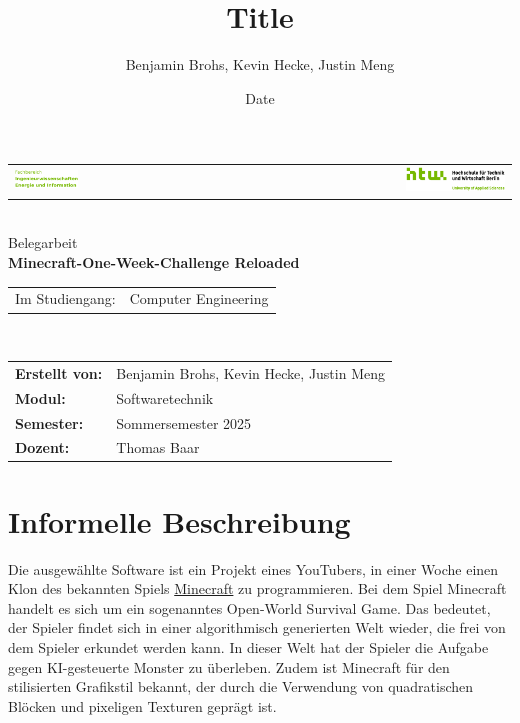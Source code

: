\documentclass{article}
\title{Title}
\author{Benjamin Brohs, Kevin Hecke, Justin Meng}
\date{Date}
\begin{document}

\begin{titlepage}
  \centering
	\begin{tabular}{lcr}
		\includegraphics[width=0.35\textwidth]{fachbereich.png} & \hspace{0.195\textwidth} & \includegraphics[width=0.35\textwidth]{Q04_HTW_Berlin_Logo_quer_pos_FARBIG_RGB.jpg}\\
	\end{tabular}	
	\\[3cm]
	\Large
	Belegarbeit\\
	\vspace{2cm}
	\textbf{Minecraft-One-Week-Challenge Reloaded}\\
	\vspace{2cm}
	\begin{tabular}{ll} 
		Im Studiengang: & Computer Engineering \\		
	\end{tabular}	
	\\[3cm]
	\normalsize
	\begin{tabular}{ll}
	      \textbf{Erstellt von:} & Benjamin Brohs, Kevin Hecke, Justin Meng \\
        \textbf{Modul:} & Softwaretechnik \\
        \textbf{Semester:} & Sommersemester 2025 \\
	\textbf{Dozent:} & Thomas Baar
	\end{tabular}	
\end{titlepage}

\tableofcontents

\newpage


\section{Informelle Beschreibung} \label{subsec:inf}

Die ausgewählte Software ist ein Projekt eines YouTubers, in einer Woche einen Klon des bekannten Spiels \href{https://www.minecraft.net}{Minecraft} zu programmieren. Bei dem Spiel Minecraft handelt es sich um ein sogenanntes Open-World Survival Game. Das bedeutet, der Spieler findet sich in einer algorithmisch generierten Welt wieder, die frei von dem Spieler erkundet werden kann. In dieser Welt hat der Spieler die Aufgabe gegen KI-gesteuerte Monster zu überleben. Zudem ist Minecraft für den stilisierten Grafikstil bekannt, der durch die Verwendung von quadratischen Blöcken und pixeligen Texturen geprägt ist.
\end{document}
